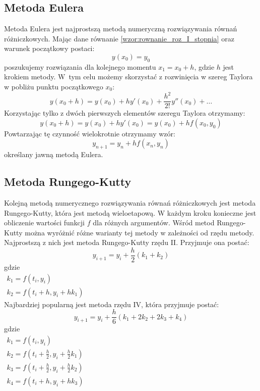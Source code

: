 \subsection*{Metoda Eulera}
Metoda Eulera jest najprostszą metodą numeryczną rozwiązywania równań różniczkowych. Mając dane równanie \eqref{wzor:rownanie_roz_I_stopnia} oraz warunek początkowy postaci:
\begin{equation}
	y(x_0) = y_0	
\end{equation}
poszukujemy rozwiązania dla kolejnego momentu $x_1 = x_0 + h$, gdzie $h$ jest krokiem metody. W~tym celu możemy skorzystać z rozwinięcia w szereg Taylora w pobliżu punktu początkowego $x_0$:
\begin{equation}
	y(x_0 + h) = y(x_0) + hy'(x_0) + \frac{h^2}{2!}y''(x_0) + \hdots
\end{equation}
Korzystając tylko z dwóch pierwszych elementów szeregu Taylora otrzymamy:
\begin{equation}
	y(x_0 + h) = y(x_0) + hy'(x_0) = y(x_0) + hf(x_0,y_0)
\end{equation}
Powtarzając tę czynność wielokrotnie otrzymamy wzór:
\begin{equation}
	y_{n+1} = y_{n} + hf(x_n,y_n)
\end{equation}
określany jawną metodą Eulera.

\subsection*{Metoda Rungego-Kutty}
Kolejną metodą numerycznego rozwiązywania równań różniczkowych jest metoda Rungego-Kutty, która jest metodą wieloetapową. W każdym kroku konieczne jest obliczenie wartości funkcji $f$ dla różnych argumentów. Wśród metod Rungego-Kutty można wyróżnić różne warianty tej metody w zależności od rzędu metody. Najprostszą z nich jest metoda Rungego-Kutty rzędu II. Przyjmuje ona postać:
\begin{equation}
	y_{i+1} = y_i + \frac{h}{2}(k_1 + k_2)
\end{equation}
gdzie \\ \hspace*{0.8cm}
$\begin{array}{l}
	k_1 = f(t_i,y_i) \\
	k_2 = f(t_i + h, y_i + hk_1)
\end{array}$ \\

Najbardziej popularną jest metoda rzędu IV, która przyjmuje postać:
\begin{equation}
	y_{i+1} = y_i + \frac{h}{6}(k_1 + 2k_2 + 2k_3 + k_4)
\end{equation}
gdzie \\ \hspace*{0.8cm}
$\begin{array}{c}
	k_1 = f(t_i,y_i) \\
	k_2 = f(t_i + \frac{h}{2}, y_i + \frac{h}{2}k_1) \\
	k_3 = f(t_i + \frac{h}{2}, y_i + \frac{h}{2}k_2) \\
	k_4 = f(t_i + h,y_i + hk_3) \\
\end{array}$ \\

